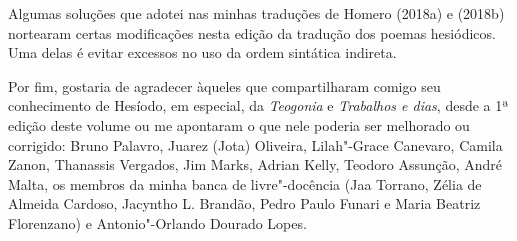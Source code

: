 Algumas soluções que adotei nas minhas traduções de Homero (2018a) e
(2018b) nortearam certas modificações nesta edição da tradução dos poemas
hesiódicos. Uma delas é evitar excessos no uso da ordem sintática
indireta.

Por fim, gostaria de agradecer àqueles que compartilharam comigo seu
conhecimento de Hesíodo, em especial, da \emph{Teogonia} e \textit{Trabalhos e dias}, desde a 1ª edição deste volume ou me apontaram o que nele poderia ser melhorado ou
corrigido: Bruno Palavro, Juarez (Jota) Oliveira,
Lilah"-Grace Canevaro, Camila Zanon, Thanassis Vergados, Jim Marks, Adrian Kelly,
Teodoro Assunção, André Malta, os membros da minha banca de
livre"-docência (Jaa Torrano, Zélia de Almeida Cardoso, Jacyntho L.
Brandão, Pedro Paulo Funari e Maria Beatriz Florenzano) e
Antonio"-Orlando Dourado Lopes.


